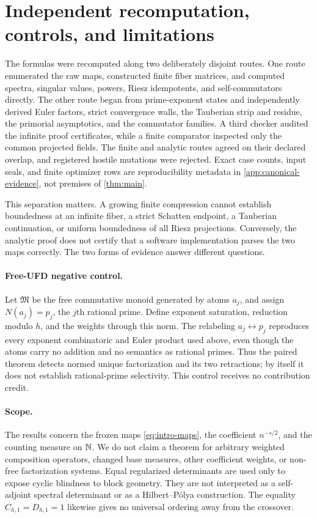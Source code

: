 \section{Independent recomputation, controls, and limitations}
\label{sec:evaluation}

The formulas were recomputed along two deliberately disjoint routes.  One
route enumerated the raw maps, constructed finite fiber matrices, and
computed spectra, singular values, powers, Riesz idempotents, and
self-commutators directly.  The other route began from prime-exponent states
and independently derived Euler factors, strict convergence walls, the
Tauberian strip and residue, the primorial asymptotics, and the commutator
families.  A third checker audited the infinite proof certificates, while a
finite comparator inspected only the common projected fields.  The finite
and analytic routes agreed on their declared overlap, and registered hostile
mutations were rejected.  Exact case counts, input seals, and finite optimizer
rows are reproducibility metadata in \cref{app:canonical-evidence}, not
premises of \cref{thm:main}.

This separation matters.  A growing finite compression cannot establish
boundedness at an infinite fiber, a strict Schatten endpoint, a Tauberian
continuation, or uniform boundedness of all Riesz projections.  Conversely,
the analytic proof does not certify that a software implementation parses
the two maps correctly.  The two forms of evidence answer different
questions.

\paragraph{Free-UFD negative control.}
Let $\mathfrak M$ be the free commutative monoid generated by atoms $a_j$,
and assign $N(a_j)=p_j$, the $j$th rational prime.  Define exponent
saturation, reduction modulo $h$, and the weights through this norm.  The
relabeling $a_j\leftrightarrow p_j$ reproduces every exponent combinatoric
and Euler product used above, even though the atoms carry no addition and no
semantics as rational primes.  Thus the paired theorem detects normed unique
factorization and its two retractions; by itself it does not establish
rational-prime selectivity.  This control receives no contribution credit.

\paragraph{Scope.}
The results concern the frozen maps \cref{eq:intro-maps}, the coefficient
$n^{-s/2}$, and the counting measure on $\mathbb N$.  We do not claim a theorem for
arbitrary weighted composition operators, changed base measures, other
coefficient weights, or non-free factorization systems.  Equal regularized
determinants are used only to expose cyclic blindness to block geometry.
They are not interpreted as a self-adjoint spectral determinant or as a
Hilbert--P\'olya construction.  The equality
$C_{h,1}=D_{h,1}=1$ likewise gives no universal ordering away from the
crossover.

